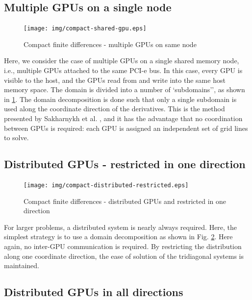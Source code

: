 \subsection{Multiple GPUs on a single node}

\begin{figure}
\begin{center}
\texttt{[image: img/compact-shared-gpu.eps]}
\caption{Compact finite differences - multiple GPUs
    on same node}
\label{fig:compact-shared-gpu}
\end{center}
\end{figure}

Here, we consider the case of multiple GPUs
on a single shared memory node, i.e.,
multiple GPUs attached to the same PCI-e bus.
In this case, every GPU is visible to the host,
and the GPUs read from and write into
the same host memory space.
The domain is divided into a number of `subdomains'',
as shown in \ref{fig:compact-shared-gpu}.
The domain decomposition is done such that
only a single subdomain is used along the
coordinate direction of the derivatives.
This is the method presented by
Sakharnykh et al. \cite{sakharnykhADIconf},
and it has the advantage that
no coordination between GPUs is required:
each GPU is assigned an independent
set of grid lines to solve.

\subsection{Distributed GPUs - restricted in one direction}

\begin{figure}
\begin{center}
\texttt{[image: img/compact-distributed-restricted.eps]}
\caption{Compact finite differences - distributed GPUs and
    restricted in one direction}
\label{fig:compact-distributed-restricted}
\end{center}
\end{figure}

For larger problems,
a distributed system is nearly always required.
Here, the simplest strategy is to use a domain decomposition
as shown in Fig. \ref{fig:compact-distributed-restricted}.
Here again, 
no inter-GPU communication is required.
By restricting the distribution along one coordinate direction,
the ease of solution of the tridiagonal systems is maintained.

\subsection{Distributed GPUs in all directions}

